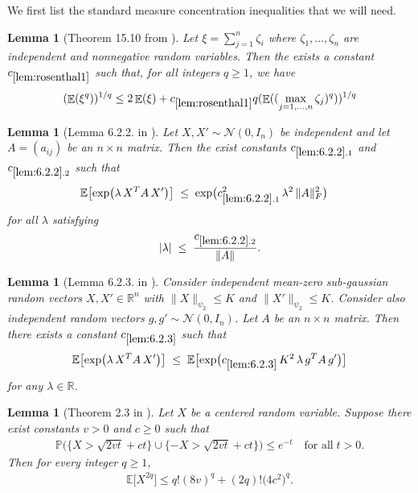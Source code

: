 \documentclass[11pt]{amsart}
\numberwithin{equation}{section}
\numberwithin{equation}{section}
\DeclareMathOperator{\E}{\mathbb{E}}
\newtheorem{lemma}[theorem]{Lemma}
\begin{document}
We first list the standard measure concentration inequalities that we will need.

\begin{lemma}[Theorem 15.10 from \cite{boucheron2013concentration}]\label{lem:rosenthal1}
Let $\xi=\sum_{j=1}^n\zeta_i$ where $\zeta_1,...,\zeta_n$ are independent and nonnegative random variables. Then the exists a constant $c_{\ref{lem:rosenthal1}}$ such that, for all integers $q \ge 1$, we have
\begin{align*}
    (\E (\xi^q))^{1/q} \le 2 \E( \xi)+ c_{\ref{lem:rosenthal1}}q (\E ((\max \limits_{j=1,...,n} \zeta_j)^q))^{1/q}
\end{align*}
\end{lemma}



\begin{lemma}[Lemma 6.2.2. in \cite{vershynin2018high}]\label{lem:6.2.2}
Let $X, X' \sim \mathcal{N}(0, I_n)$ be independent and let $A = (a_{ij})$ be an $n \times n$ matrix. Then the exist constants $c_{\ref{lem:6.2.2}.1}$ and $c_{\ref{lem:6.2.2}.2}$ such that
\begin{align*}
\mathbb{E}\bigl[\exp\bigl(\lambda\,X^T A\,X'\bigr)\bigr]
&\;\le\; \exp\bigl(c_{\ref{lem:6.2.2}.1}^2\,\lambda^2\,\|A\|_F^2\bigr)
\end{align*}
for all $\lambda$ satisfying 
\begin{align*}
|\lambda| \;\le\; \frac{c_{\ref{lem:6.2.2}.2}}{\|A\|}.
\end{align*}
\end{lemma}

\begin{lemma}[Lemma 6.2.3. in \cite{vershynin2018high}]\label{lem:6.2.3}
Consider independent mean-zero sub-gaussian random vectors $X, X' \in \mathbb{R}^n$ 
with $\|X\|_{\psi_2} \le K$ and $\|X'\|_{\psi_2} \le K$. 
Consider also independent random vectors $g, g' \sim \mathcal{N}(0,I_n)$. 
Let $A$ be an $n \times n$ matrix. 
Then there exists a constant $c_{\ref{lem:6.2.3}}$ such that
\begin{align*}
\mathbb{E}\bigl[\exp\bigl(\lambda\,X^T A\,X'\bigr)\bigr]
\;\le\;
\mathbb{E}\bigl[\exp\bigl(c_{\ref{lem:6.2.3}}\,K^2\,\lambda\,g^T A\,g'\bigr)\bigr]
\end{align*}
for any $\lambda \in \mathbb{R}$.
\end{lemma}

\begin{lemma}
[Theorem 2.3 in \cite{boucheron2013concentration}]\label{thm:subgamma-moments}
Let $X$ be a centered random variable. Suppose there exist constants $v>0$ and $c\ge 0$ such that 
\begin{align*}
\mathbb{P}\bigl(\{X > \sqrt{2vt} +ct\} \cup \{-X > \sqrt{2vt} + ct\bigr\}) 
\le e^{-t}
\quad\text{for all}\; t>0.
\end{align*}
Then for every integer $q \ge 1$, 
\begin{align*}
\mathbb{E}\bigl[X^{2q}\bigr] 
\le
q!(8v)^{q} +(2q)!\bigl(4c^{2}\bigr)^{q}.
\end{align*}
\end{lemma} 
\end{document}
